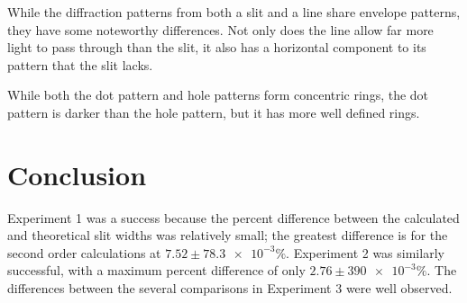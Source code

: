 \documentclass[12pt]{article}
\begin{document}
\subsubsubsection{}

\qq While the diffraction patterns from both a slit and a line share envelope
patterns, they have some noteworthy differences. Not only does the line allow
far more light to pass through than the slit, it also has a horizontal component
to its pattern that the slit lacks.

\subsubsubsection{}

\qq While both the dot pattern and hole patterns form concentric rings, the dot
pattern is darker than the hole pattern, but it has more well defined rings. 



\section{Conclusion}

\qq Experiment 1 was a success because the percent difference between the
calculated and theoretical slit widths was relatively small; the greatest
difference is for the second order calculations at
\(7.52 \pm \num{78.3e-3} \%\). Experiment 2 was similarly successful, with a
maximum percent difference of only \(2.76 \pm \num{390e-3} \%\). The differences
between the several comparisons in Experiment 3 were well observed.

\end{document}
